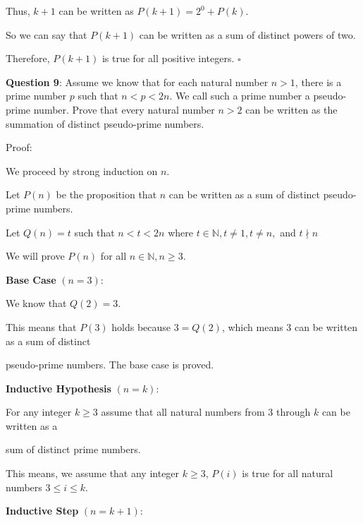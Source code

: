 \documentclass{article} %
\newcommand{\question}[2][]{\begin{flushleft}
        \textbf{Question #1}: #2

\end{flushleft}}
\begin{document}
    \tabto{1cm} Thus, $k + 1$ can be written as $P(k + 1) = 2^0 + P(k)$.

    \tabto{1cm} So we can say that $P(k + 1)$ can be written as a sum of distinct powers of two.

    Therefore, $P(k + 1)$ is true for all positive integers. $\square$

    \newpage

                                                                   

    \question[9]{Assume we know that for each natural number $n > 1$, there is a prime number $p$ 
    such that $n < p < 2n$. We call such a prime number a pseudo-prime number. Prove that every 
    natural number $n > 2$ can be written as the summation of distinct pseudo-prime numbers.}

    Proof:

    We proceed by strong induction on $n$.

    Let $P(n)$ be the proposition that $n$ can be written as a sum of distinct pseudo-prime numbers.

    Let $Q(n) = t$ such that $n < t < 2n$ where $t \in \mathbb{N}, t \neq 1, t \neq n,$ and $t \nmid n$ 

    We will prove $P(n)$ for all $n \in \mathbb{N}, n \geq 3$.

    \textbf{Base Case} $(n = 3)$:

    We know that $Q(2) = 3$.

    This means that $P(3)$ holds because $3 = Q(2)$, which means 3 can be written as a sum of distinct 
    
    pseudo-prime numbers. The base case is proved.

    \textbf{Inductive Hypothesis} $(n = k)$:

    For any integer $k \geq 3$ assume that all natural numbers from 3 through $k$ can be written as a 
    
    sum of distinct prime numbers. 

    This means, we assume that any integer $k \geq 3$, $P(i)$ is true for all natural numbers $3 \leq i \leq k$.

    \textbf{Inductive Step} $(n = k + 1)$:
\end{document}
